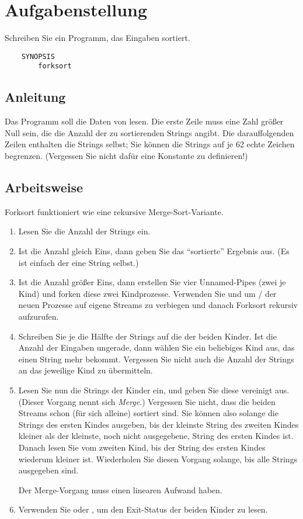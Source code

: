 




\section*{Aufgabenstellung}
Schreiben Sie ein Programm, das Eingaben sortiert.
\begin{verbatim}
    SYNOPSIS
        forksort
\end{verbatim}

\subsection*{Anleitung}
Das Programm soll die Daten von  lesen. Die erste Zeile muss
eine Zahl größer Null sein, die die Anzahl der zu sortierenden Strings angibt.
Die darauffolgenden Zeilen enthalten die Strings selbst; Sie können die
Strings auf je 62 echte Zeichen begrenzen. (Vergessen Sie nicht dafür eine
Konstante zu definieren!)

\subsection*{Arbeitsweise}
Forksort funktioniert wie eine rekursive Merge-Sort-Variante.
\begin{enumerate}
\item Lesen Sie die Anzahl der Strings ein.
\item Ist die Anzahl gleich Eins, dann geben Sie das "`sortierte"' Ergebnis
  aus. (Es ist einfach der eine String selbst.)
\item Ist die Anzahl größer Eins, dann erstellen Sie vier Unnamed-Pipes (zwei
  je Kind) und forken diese zwei Kindprozesse. Verwenden Sie 
  und  um / der neuen
  Prozesse auf eigene Streams zu verbiegen und danach Forksort rekursiv
  aufzurufen.
\item Schreiben Sie je die Hälfte der Strings auf die  der
  beiden Kinder. Ist die Anzahl der Eingaben ungerade, dann wählen Sie
  ein beliebiges Kind aus, das einen String mehr bekommt. Vergessen Sie nicht
  auch die Anzahl der Strings an das jeweilige Kind zu übermitteln.
\item Lesen Sie nun die Strings der Kinder ein, und geben Sie diese vereinigt
  aus. (Dieser Vorgang nennt sich \emph{Merge}.) Vergessen Sie nicht, dass die
  beiden Streams schon (für sich alleine) sortiert sind. Sie können also
  solange die Strings des ersten Kindes ausgeben, bis der kleinste String des
  zweiten Kindes kleiner als der kleinste, noch nicht ausgegebene, String des
  ersten Kindes ist. Danach lesen Sie vom zweiten Kind, bis der String des
  ersten Kindes wiederum kleiner ist. Wiederholen Sie diesen Vorgang solange,
  bis alle Strings ausgegeben sind.

  Der Merge-Vorgang muss einen linearen Aufwand haben.
\item Verwenden Sie  oder , um den
  Exit-Status der beiden Kinder zu lesen.
\end{enumerate}

